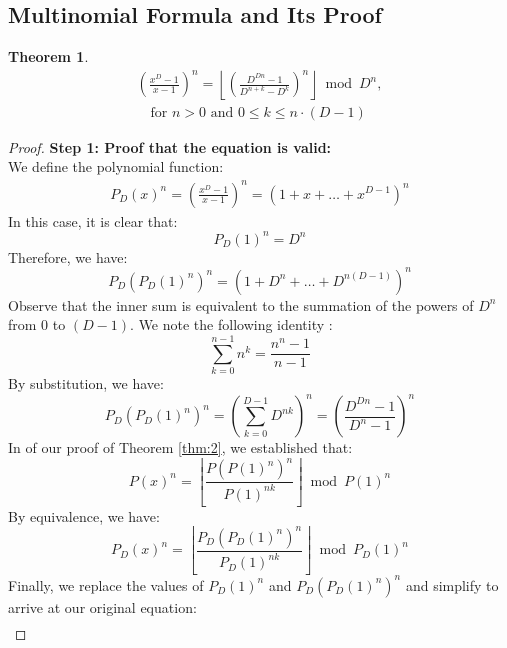 \documentclass{article}
\theoremstyle{plain}
\theoremstyle{definition}
\newtheorem{thm}{Theorem}
\begin{document}
\subsection{Multinomial Formula and Its Proof}
\begin{thm}
\label{thm:3}
\begin{align*}
    [x^k] \left(\frac{x^{D}-1}{x-1}\right)^n = \left\lfloor \left(\frac{D^{Dn} - 1}{D^{n+k} - D^k}\right)^n\right\rfloor \bmod D^n, \\ \quad \text{for } n > 0 \text{ and } 0 \leq k \leq n \cdot (D-1)
\end{align*}
\end{thm}
\begin{proof}
\textbf{Step 1: Proof that the equation is valid:} \\
We define the polynomial function:
\begin{align}
    P_D(x)^n = \left(\frac{x^{D}-1}{x-1}\right)^n = (1 + x + \ldots + x^{D-1})^n
\end{align}
In this case, it is clear that:
\begin{equation}
    P_D(1)^n = D^n
\end{equation}
Therefore, we have:
\begin{equation}
    P_D(P_D(1)^n)^n = (1 + D^n + \ldots + D^{n (D - 1)})^n
\end{equation}
Observe that the inner sum is equivalent to the summation of the powers of $D^n$ from $0$ to $(D - 1)$. We note the following identity \cite{A023037}:
\begin{equation}
    \sum_{k=0}^{n-1} n^k = \frac{n^{n} - 1}{n - 1}
\end{equation}
By substitution, we have:
\begin{equation}
    P_D(P_D(1)^n)^n = \left(\sum_{k=0}^{D-1} D^{nk}\right)^n = \left(\frac{D^{Dn} - 1}{D^{n} - 1}\right)^n
\end{equation}
In of our proof of Theorem \ref{thm:2}, we established that:
\begin{equation}
    [x^k] P(x)^{n} = \left\lfloor\frac{P(P(1)^n)^{n}}{P(1)^{n k}}\right\rfloor \bmod{P(1)^{n}}
\end{equation}
By equivalence, we have:
\begin{equation}
    [x^k] P_D(x)^{n} = \left\lfloor\frac{P_D(P_D(1)^n)^{n}}{P_D(1)^{n k}}\right\rfloor \bmod{P_D(1)^{n}}
\end{equation}
Finally, we replace the values of $P_D(1)^n$ and $P_D(P_D(1)^n)^n$ and simplify to arrive at our original equation:
\begin{align}

\end{align}
\end{proof}
\end{document}
